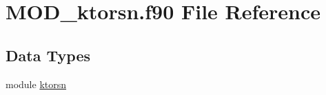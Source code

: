 \hypertarget{MOD__ktorsn_8f90}{\section{M\-O\-D\-\_\-ktorsn.\-f90 File Reference}
\label{MOD__ktorsn_8f90}
}
\subsection*{Data Types}
\begin{DoxyCompactItemize}
\item 
module \hyperlink{classktorsn}{ktorsn}
\end{DoxyCompactItemize}
